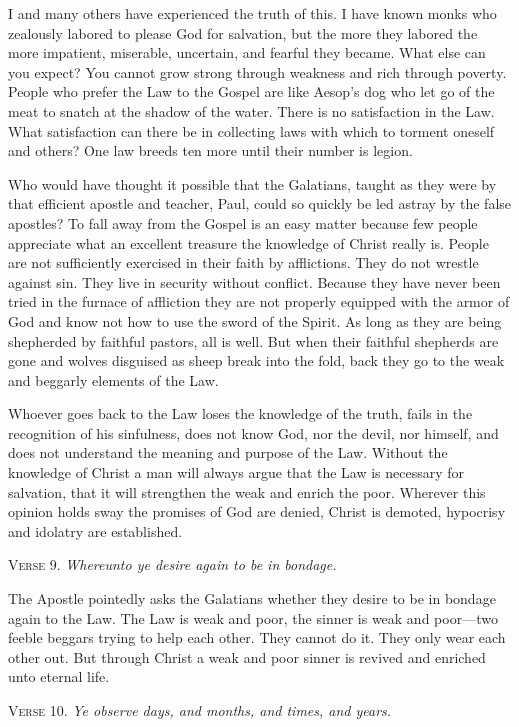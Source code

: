 I and many others have experienced the truth of this. I have known monks who zealously labored to please God for salvation, but the more they labored the more impatient, miserable, uncertain, and fearful they became. What else can you expect? You cannot grow strong through weakness and rich through poverty. People who prefer the Law to the Gospel are like Aesop’s dog who let go of the meat to snatch at the shadow of the water. There is no satisfaction in the Law. What satisfaction can there be in collecting laws with which to torment oneself and others? One law breeds ten more until their number is legion.

Who would have thought it possible that the Galatians, taught as they were by that efficient apostle and teacher, Paul, could so quickly be led astray by the false apostles? To fall away from the Gospel is an easy matter because few people appreciate what an excellent treasure the knowledge of Christ really is. People are not sufficiently exercised in their faith by afflictions. They do not wrestle against sin. They live in security without conflict. Because they have never been tried in the furnace of affliction they are not properly equipped with the armor of God and know not how to use the sword of the Spirit. As long as they are being shepherded by faithful pastors, all is well. But when their faithful shepherds are gone and wolves disguised as sheep break into the fold, back they go to the weak and beggarly elements of the Law.

Whoever goes back to the Law loses the knowledge of the truth, fails in the recognition of his sinfulness, does not know God, nor the devil, nor himself, and does not understand the meaning and purpose of the Law. Without the knowledge of Christ a man will always argue that the Law is necessary for salvation, that it will strengthen the weak and enrich the poor. Wherever this opinion holds sway the promises of God are denied, Christ is demoted, hypocrisy and idolatry are established.

\textsc{Verse} 9. \emph{Whereunto ye desire again to be in bondage.}

The Apostle pointedly asks the Galatians whether they desire to be in bondage again to the Law. The Law is weak and poor, the sinner is weak and poor—two feeble beggars trying to help each other. They cannot do it. They only wear each other out. But through Christ a weak and poor sinner is revived and enriched unto eternal life.

\textsc{Verse} 10. \emph{Ye observe days, and months, and times, and years.}

